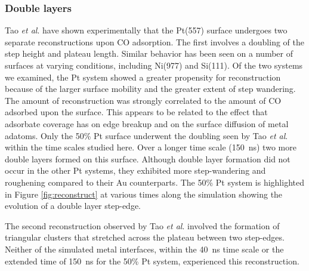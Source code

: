 \subsubsection{Double layers}
Tao {\it et al}.\citep{Tao:2010aa} have shown experimentally that the
Pt(557) surface undergoes two separate reconstructions upon CO
adsorption.  The first involves a doubling of the step height and
plateau length.  Similar behavior has been seen on a number of
surfaces at varying conditions, including Ni(977) and
Si(111).\citep{Williams:1994aa, Williams:1991qd, Pearl:2001ca} Of the two systems we
examined, the Pt system showed a greater propensity for reconstruction
because of the larger surface mobility and the greater extent of step
wandering.  The amount of reconstruction was strongly correlated to
the amount of CO adsorbed upon the surface.  This appears to be
related to the effect that adsorbate coverage has on edge breakup and
on the surface diffusion of metal adatoms. Only the 50\% Pt surface
underwent the doubling seen by Tao {\it et al}.\citep{Tao:2010aa} within
the time scales studied here.  Over a longer time scale (150~ns) two
more double layers formed on this surface. Although double layer
formation did not occur in the other Pt systems, they exhibited more
step-wandering and roughening compared to their Au counterparts. The
50\% Pt system is highlighted in Figure \ref{fig:reconstruct} at
various times along the simulation showing the evolution of a double
layer step-edge.

The second reconstruction observed by Tao {\it et al}.\citep{Tao:2010aa}
involved the formation of triangular clusters that stretched across
the plateau between two step-edges. Neither of the simulated metal
interfaces, within the 40~ns time scale or the extended time of 150~ns
for the 50\% Pt system, experienced this reconstruction.

